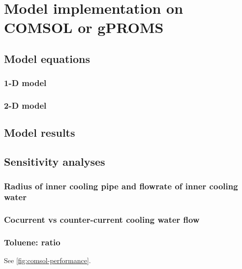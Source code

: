 \section{Model implementation on COMSOL or gPROMS}
\subsection{Model equations}
\subsubsection{1-D model}
\subsubsection{2-D model}
\subsection{Model results}

\subsection{Sensitivity analyses}

\subsubsection{Radius of inner cooling pipe and flowrate of inner cooling water}
\subsubsection{Cocurrent vs counter-current cooling water flow}
\subsubsection{Toluene:  ratio}

See \cref{fig:comsol-performance}.

